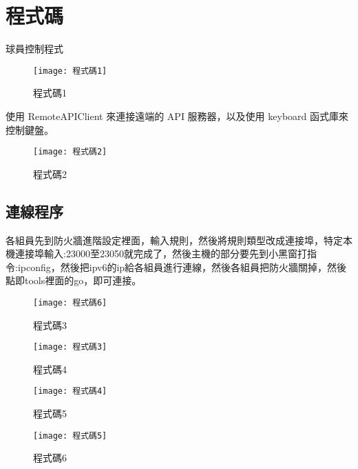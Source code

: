 \chapter{程式碼}
 球員控制程式\\
 
 \begin{figure}[hbt!]
\begin{center}
\texttt{[image: 程式碼1]}
\caption{\Large 程式碼1}\label{fig.程式碼1}
\end{center}
\end{figure}

 使用 RemoteAPIClient 來連接遠端的 API 服務器，以及使用
keyboard 函式庫來控制鍵盤。\\
\begin{figure}[hbt!]
\begin{center}
\texttt{[image: 程式碼2]}
\caption{\Large 程式碼2}\label{fig.程式碼2}
\end{center}
\end{figure}
\newpage
 
\section{連線程序}
各組員先到防火牆進階設定裡面，輸入規則，然後將規則類型改成連接埠，特定本機連接埠輸入:23000至23050就完成了，然後主機的部分要先到小黑窗打指令:ipconfig，然後把ipv6的ip給各組員進行連線，然後各組員把防火牆關掉，然後點即tools裡面的go，即可連接。\\
\begin{figure}[hbt!]
\begin{center}
\texttt{[image: 程式碼6]}
\caption{\Large 程式碼3}\label{fig.程式碼6}
\end{center}
\end{figure}

\begin{figure}[hbt!]
\begin{center}
\texttt{[image: 程式碼3]}
\caption{\Large 程式碼4}\label{fig.程式碼3}
\end{center}
\end{figure}
\newpage

\begin{figure}[hbt!]
\begin{center}
\texttt{[image: 程式碼4]}
\caption{\Large 程式碼5}\label{fig.程式碼4}
\end{center}
\end{figure}

\begin{figure}[hbt!]
\begin{center}
\texttt{[image: 程式碼5]}
\caption{\Large 程式碼6}\label{fig.程式碼5}
\end{center}
\end{figure}
\newpage